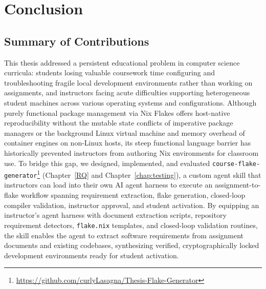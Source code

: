 \chapter{Conclusion}
\label{conclusion}

\section{Summary of Contributions}

This thesis addressed a persistent educational problem in computer science curricula:
students losing valuable coursework time configuring and troubleshooting fragile
local development environments rather than working on assignments, and instructors
facing acute difficulties supporting heterogeneous student machines across various
operating systems and configurations. Although purely functional package
management via Nix Flakes offers host-native reproducibility without the mutable
state conflicts of imperative package managers or the background Linux virtual
machine and memory overhead of container engines on non-Linux hosts, its steep functional
language barrier has historically prevented instructors from authoring Nix environments
for classroom use. To bridge this gap, we designed, implemented, and evaluated \texttt{course-flake-generator}\footnote{\url{https://github.com/curlyLasagna/Thesis-Flake-Generator}}
(Chapter~\ref{RQ} and Chapter~\ref{chap:testing}), a custom agent skill that
instructors can load into their own AI agent harness to execute an assignment-to-flake
workflow spanning requirement extraction, flake generation, closed-loop compiler
validation, instructor approval, and student activation. By equipping an instructor's
agent harness with document extraction scripts, repository requirement detectors,
\texttt{flake.nix} templates, and closed-loop validation routines, the skill
enables the agent to extract software requirements from assignment documents and
existing codebases, synthesizing verified, cryptographically locked development
environments ready for student activation.

